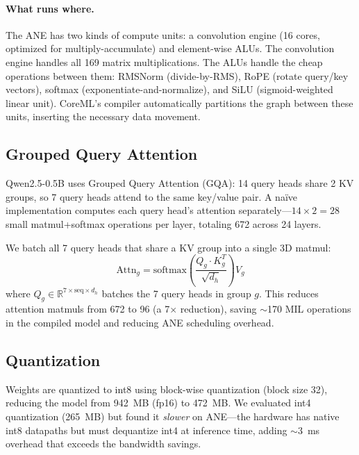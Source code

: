 \documentclass[11pt,twocolumn]{article}
\begin{document}
\paragraph{What runs where.}
The ANE has two kinds of compute units: a convolution engine (16
cores, optimized for multiply-accumulate) and element-wise ALUs.
The convolution engine handles all 169 matrix multiplications.
The ALUs handle the cheap operations between them: RMSNorm
(divide-by-RMS), RoPE (rotate query/key vectors), softmax
(exponentiate-and-normalize), and SiLU (sigmoid-weighted linear
unit).  CoreML's compiler automatically partitions the graph between
these units, inserting the necessary data movement.

\subsection{Grouped Query Attention}

Qwen2.5-0.5B uses Grouped Query Attention (GQA): 14 query heads
share 2 KV groups, so 7 query heads attend to the same key/value
pair.  A na\"ive implementation computes each query head's attention
separately---$14 \times 2 = 28$ small matmul+softmax operations per
layer, totaling 672 across 24 layers.

We batch all 7 query heads that share a KV group into a single
3D matmul:
\begin{equation}
\text{Attn}_g = \text{softmax}\!\left(\frac{Q_g \cdot K_g^T}{\sqrt{d_h}}\right) V_g
\end{equation}
where $Q_g \in \mathbb{R}^{7 \times \text{seq} \times d_h}$ batches
the 7 query heads in group $g$.  This reduces attention matmuls from
672 to 96 (a 7$\times$ reduction), saving $\sim$170 MIL operations
in the compiled model and reducing ANE scheduling overhead.

\subsection{Quantization}

Weights are quantized to int8 using block-wise quantization (block
size 32), reducing the model from 942~MB (fp16) to 472~MB.  We
evaluated int4 quantization (265~MB) but found it \emph{slower} on
ANE---the hardware has native int8 datapaths but must dequantize int4
at inference time, adding $\sim$3~ms overhead that exceeds the
bandwidth savings.
\end{document}
